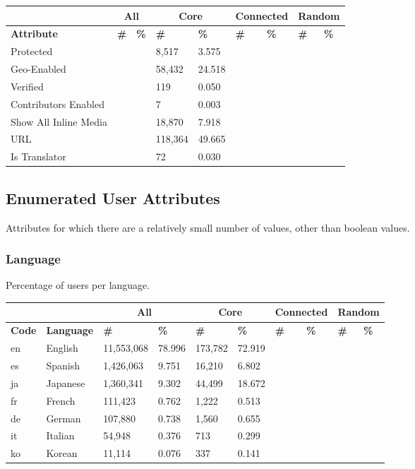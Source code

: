 \begin{tabular}{| l | l | l | l | l | l | l | l | l |}
\hline
& \multicolumn{2}{|c|}{\textbf{All}} & \multicolumn{2}{|c|}{\textbf{Core}} & \multicolumn{2}{|c|}{\textbf{Connected}} & \multicolumn{2}{|c|}{\textbf{Random}} \\ \hline
\textbf{Attribute} & \textbf{\#} & \textbf{\%} & \textbf{\#} & \textbf{\%} & \textbf{\#} & \textbf{\%} & \textbf{\#} & \textbf{\%} \\ \hline
Protected & & & 8,517 & 3.575 & & & & \\ \hline
Geo-Enabled & & & 58,432 & 24.518 & & & & \\ \hline
Verified & & & 119 & 0.050 & & & & \\ \hline
Contributors Enabled & & & 7 & 0.003 & & & & \\ \hline
Show All Inline Media & & & 18,870 & 7.918 & & & & \\ \hline
URL & & & 118,364 & 49.665 & & & & \\ \hline
Is Translator & & & 72 & 0.030 & & & & \\ \hline
\end{tabular}

\subsection{Enumerated User Attributes}
Attributes for which there are a relatively small number of values, other than boolean values.
\subsubsection{Language}
Percentage of users per language.\\

\begin{tabular}{| l | l | l | l | l | l | l | l | l | l |}
\hline
& & \multicolumn{2}{|c|}{\textbf{All}} & \multicolumn{2}{|c|}{\textbf{Core}} & \multicolumn{2}{|c|}{\textbf{Connected}} & \multicolumn{2}{|c|}{\textbf{Random}} \\ \hline
\textbf{Code} & \textbf{Language} & \textbf{\#} & \textbf{\%} & \textbf{\#} & \textbf{\%} & \textbf{\#} & \textbf{\%} & \textbf{\#} & \textbf{\%} \\ \hline
en & English & 11,553,068 & 78.996 & 173,782 & 72.919 & & & & \\ \hline
es & Spanish & 1,426,063 & 9.751 & 16,210 & 6.802 & & & & \\ \hline
ja & Japanese & 1,360,341 & 9.302 & 44,499 & 18.672 & & & & \\ \hline
fr & French & 111,423 & 0.762 & 1,222 & 0.513 & & & & \\ \hline
de & German & 107,880 & 0.738 & 1,560 & 0.655 & & & & \\ \hline
it & Italian & 54,948 & 0.376 & 713 & 0.299 & & & & \\ \hline
ko & Korean & 11,114 & 0.076 & 337 & 0.141 & & & & \\ \hline
\end{tabular}

